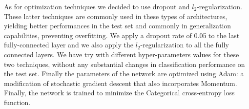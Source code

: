As for optimization techniques we decided to use dropout and $l_2$-regularization. These latter techniques are commonly used in these types of architectures, yielding better performances in the test set and commonly in generalization capabilities, preventing overfitting. We apply a dropout rate of 0.05 to the last fully-connected layer and we also apply the $l_2$-regularization to all the fully connected layers. We have try with different hyper-parameters values for these two techniques, without any substantial changes in classification performance on the test set. Finally the parameters of the network are optimized using Adam: a modification of stochastic gradient descent that also incorporates Momentum. Finally, the network is trained to minimize the Categorical cross-entropy loss function.
